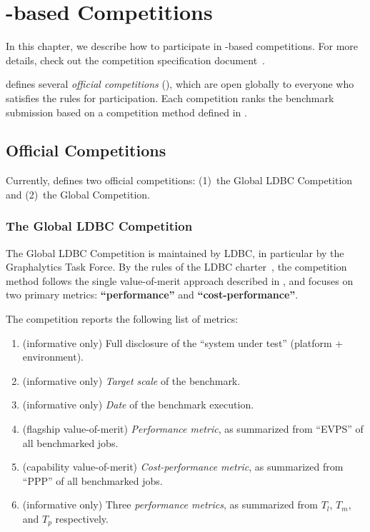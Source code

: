 \chapter{\toolname-based Competitions} \label{chap:competitions}

In this chapter, we describe how to participate in \toolname-based competitions. 
For more details, check out the competition specification document~\cite{CompetitionSpecification}.

\toolname{} defines several {\it official competitions} (), which are open globally to everyone who satisfies the rules for participation. Each competition ranks the benchmark submission based on a competition method defined in .




\section{Official \toolname{} Competitions}
\label{sec:competitions:overview}
Currently, \toolname{} defines two official competitions: (1)~the Global LDBC Competition and (2)~the Global \toolname{} Competition.


\subsection{The Global LDBC Competition} \label{sec:competitions:ldbc}
The Global LDBC Competition is maintained by LDBC, in particular by the Graphalytics Task Force. By the rules of the LDBC charter~\cite{ldbc_byelaws}, the competition method follows the single value-of-merit approach described in , and focuses on two primary metrics: {\bf ``performance''} and {\bf ``cost-performance''}.

The competition reports the following list of metrics:
\begin{enumerate}
    \item (informative only) Full disclosure of the ``system under test'' (platform + environment).
    \item (informative only) {\it Target scale} of the benchmark.
    \item (informative only) {\it Date} of the benchmark execution.
	\item (flagship value-of-merit) {\it Performance metric}, as summarized from ``EVPS'' of all benchmarked jobs.
	\item (capability value-of-merit) {\it Cost-performance metric}, as summarized from ``PPP'' of all benchmarked jobs.
	\item (informative only) Three {\it performance metrics}, as summarized from $T_l$, $T_m$, and $T_p$ respectively.
\end{enumerate}

